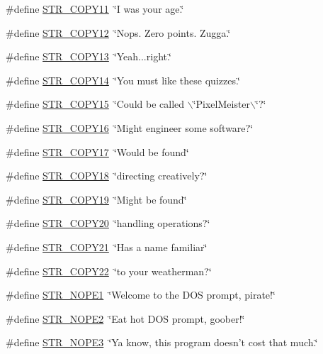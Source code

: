 \begin{DoxyCompactItemize}
\#define \hyperlink{F__SPEAR_8H_a174dd5ce83554e53b83780078229d011}{STR\_\-COPY11}~\char`\"{}I was your age.\char`\"{}
\item 
\#define \hyperlink{F__SPEAR_8H_ac7b7617040a93c871a02cd3baf9d7fd3}{STR\_\-COPY12}~\char`\"{}Nops.  Zero points.  Zugga.\char`\"{}
\item 
\#define \hyperlink{F__SPEAR_8H_a2ca7ffeb121c4599e89e9dc7d72c78cc}{STR\_\-COPY13}~\char`\"{}Yeah...right.\char`\"{}
\item 
\#define \hyperlink{F__SPEAR_8H_a93713b4d54e91a2c3ce5f25e1dcc5100}{STR\_\-COPY14}~\char`\"{}You must like these quizzes.\char`\"{}
\item 
\#define \hyperlink{F__SPEAR_8H_a51f99112bb6e4498607543fd51d59aca}{STR\_\-COPY15}~\char`\"{}Could be called $\backslash$\char`\"{}PixelMeister$\backslash$\char`\"{}?\char`\"{}
\item 
\#define \hyperlink{F__SPEAR_8H_a0735ea9de5590a809ddf86b0101908fe}{STR\_\-COPY16}~\char`\"{}Might engineer some software?\char`\"{}
\item 
\#define \hyperlink{F__SPEAR_8H_a818918baaa915d6d517a40d63a9e3caf}{STR\_\-COPY17}~\char`\"{}Would be found\char`\"{}
\item 
\#define \hyperlink{F__SPEAR_8H_acde25f14c0f0cc4649a9c6767e5fed67}{STR\_\-COPY18}~\char`\"{}directing creatively?\char`\"{}
\item 
\#define \hyperlink{F__SPEAR_8H_aa99f2b0e4d262f3dc345d1df4b8055f6}{STR\_\-COPY19}~\char`\"{}Might be found\char`\"{}
\item 
\#define \hyperlink{F__SPEAR_8H_a4126c47dbcda9c57ebc49b7eadacd0af}{STR\_\-COPY20}~\char`\"{}handling operations?\char`\"{}
\item 
\#define \hyperlink{F__SPEAR_8H_a45129b40b4fe196e6f4ddde3bd8dd7b7}{STR\_\-COPY21}~\char`\"{}Has a name familiar\char`\"{}
\item 
\#define \hyperlink{F__SPEAR_8H_ae864cbb961c9e408817d3d86336b4671}{STR\_\-COPY22}~\char`\"{}to your weatherman?\char`\"{}
\item 
\#define \hyperlink{F__SPEAR_8H_aa71fcd73ea18c3b3adfa37366b46cb09}{STR\_\-NOPE1}~\char`\"{}Welcome to the DOS prompt, pirate!\char`\"{}
\item 
\#define \hyperlink{F__SPEAR_8H_ae64af068db402eea930d2e29f0b69d51}{STR\_\-NOPE2}~\char`\"{}Eat hot DOS prompt, goober!\char`\"{}
\item 
\#define \hyperlink{F__SPEAR_8H_a15822f1d02b43db46d9ca0cbec39e1a5}{STR\_\-NOPE3}~\char`\"{}Ya know, this program doesn't cost that much.\char`\"{}
\item 

\end{DoxyCompactItemize}
